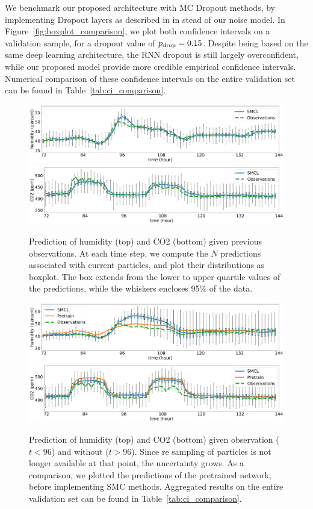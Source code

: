 \documentclass{article}
\begin{document}
We benchmark our proposed architecture with MC Dropout methods, by implementing Dropout layers as described in \cite{Gal2016NIPS} in stead of our noise model.
In Figure~\ref{fig:boxplot_comparison}, we plot both confidence intervals on a validation sample, for a dropout value of $p_\textnormal{drop}=0.15$.
Despite being based on the same deep learning architecture, the RNN dropout is still largely overconfident, while our proposed model provide more credible empirical confidence intervals.
Numerical comparison of these confidence intervals on the entire validation set can be found in Table~\ref{tab:ci_comparison}.

\begin{figure}[htpb]
	\centering
	\includegraphics[width=.7\linewidth]{filter_kp1_hum.png}
	\includegraphics[width=.7\linewidth]{filter_kp1_co2.png}
	\caption{Prediction of humidity (top) and CO2 (bottom) given previous observations. At each time step, we compute the $N$ predictions associated with current particles, and plot their distributions as boxplot. The box extends from the lower to upper quartile values of the predictions, while the whiskers encloses 95\% of the data.}%
	\label{fig:filter_k+1}
\end{figure}

\begin{figure}[htpb]
	\centering
	\includegraphics[width=.7\linewidth]{filter_kp24_hum.png}
	\includegraphics[width=.7\linewidth]{filter_kp24_co2.png}
	\caption{Prediction of humidity (top) and CO2 (bottom) given observation ($t<96$) and without ($t>96$). Since re sampling of particles is not longer available at that point, the uncertainty grows. As a comparison, we plotted the predictions of the pretrained network, before implementing SMC methods. Aggregated results on the entire validation set can be found in Table~\ref{tab:ci_comparison}.}%
	\label{fig:filter_k+24}
\end{figure}
\end{document}
